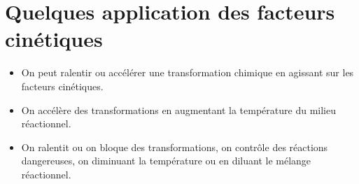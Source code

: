 \documentclass[12pt]{article}
\begin{document}
\section{Quelques application des facteurs cinétiques}
\begin{itemize}
	\item On peut ralentir ou accélérer une transformation chimique en agissant sur les facteurs cinétiques.
	\item On accélère des transformations en augmentant la température du milieu réactionnel.
	\item On ralentit ou on bloque des transformations, on contrôle des réactions dangereuses, on diminuant la température ou en diluant le mélange réactionnel.
\end{itemize}
\end{document}
